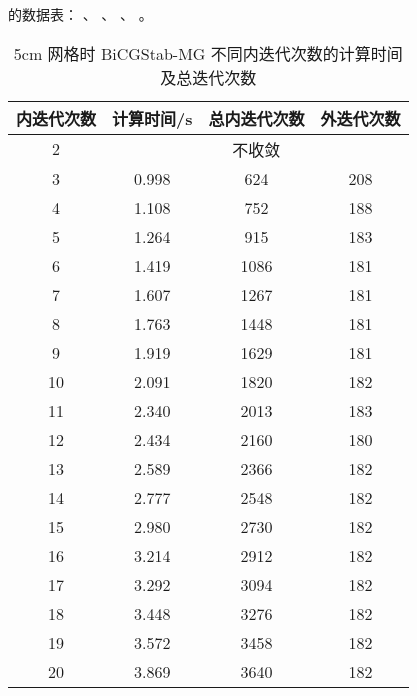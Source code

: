 \begin{datasheet}
的数据表：
、
、
、
。

\begin{table}
\centering
\caption{5cm 网格时 BiCGStab-MG 不同内迭代次数的计算时间及总迭代次数}
\label{tab:equsolve.iter.bicgstab-mg.5cm}
\begin{tabular}{cccc}
\toprule
内迭代次数 & 计算时间/s & 总内迭代次数 & 外迭代次数\\
\midrule
2 & \multicolumn{3}{c}{不收敛} \\ %
3 & 0.998 & 624 & 208\\
4 & 1.108 & 752 & 188\\
5 & 1.264 & 915 & 183\\
6 & 1.419 & 1086 & 181\\
7 & 1.607 & 1267 & 181\\
8 & 1.763 & 1448 & 181\\
9 & 1.919 & 1629 & 181\\
10 & 2.091 & 1820 & 182\\
11 & 2.340 & 2013 & 183\\
12 & 2.434 & 2160 & 180\\
13 & 2.589 & 2366 & 182\\
14 & 2.777 & 2548 & 182\\
15 & 2.980 & 2730 & 182\\
16 & 3.214 & 2912 & 182\\
17 & 3.292 & 3094 & 182\\
18 & 3.448 & 3276 & 182\\
19 & 3.572 & 3458 & 182\\
20 & 3.869 & 3640 & 182\\
\bottomrule
\end{tabular}
\end{table}


\end{datasheet}
